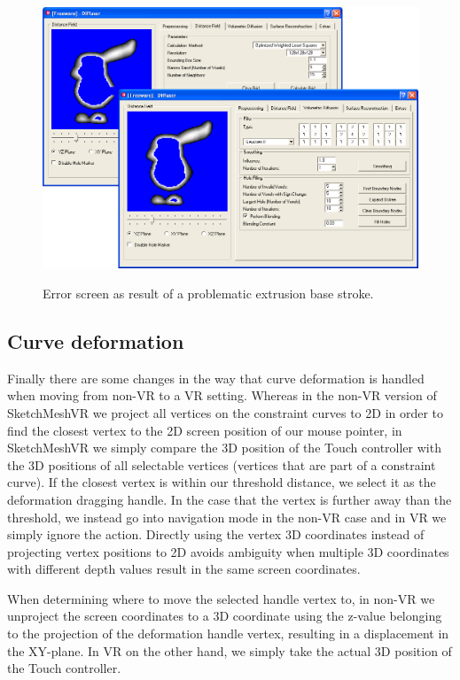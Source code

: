 \begin{figure}[!h]
    \centering
    \includegraphics[width=0.7260\linewidth]{figures/voldiff_ui}\\
    \caption[Error screen as result of a problematic extrusion base stroke]{Error screen as result of a problematic extrusion base stroke.
      \label{fig:errordisplay}}
\end{figure}

\subsection{Curve deformation}
Finally there are some changes in the way that curve deformation is handled when moving from non-VR to a VR setting. Whereas in the non-VR version of SketchMeshVR we project all vertices on the constraint curves to 2D in order to find the closest vertex to the 2D screen position of our mouse pointer, in SketchMeshVR we simply compare the 3D position of the Touch controller with the 3D positions of all selectable vertices (vertices that are part of a constraint curve). If the closest vertex is within our threshold distance, we select it as the deformation dragging handle. In the case that the vertex is further away than the threshold, we instead go into navigation mode in the non-VR case and in VR we simply ignore the action. Directly using the vertex 3D coordinates instead of projecting vertex positions to 2D avoids ambiguity when multiple 3D coordinates with different depth values result in the same screen coordinates. 

When determining where to move the selected handle vertex to, in non-VR we unproject the screen coordinates to a 3D coordinate using the z-value belonging to the projection of the deformation handle vertex, resulting in a displacement in the XY-plane. In VR on the other hand, we simply take the actual 3D position of the Touch controller. 

